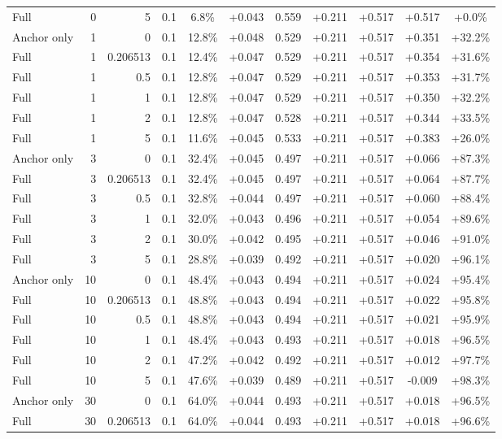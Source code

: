 \begin{table}[htbp]
\begin{tabular}{lrrrccccccc}
Full & 0 & 5 & 0.1 & 6.8\% & +0.043 & 0.559 & +0.211 & +0.517 & +0.517 & +0.0\% \\
Anchor only & 1 & 0 & 0.1 & 12.8\% & +0.048 & 0.529 & +0.211 & +0.517 & +0.351 & +32.2\% \\
Full & 1 & 0.206513 & 0.1 & 12.4\% & +0.047 & 0.529 & +0.211 & +0.517 & +0.354 & +31.6\% \\
Full & 1 & 0.5 & 0.1 & 12.8\% & +0.047 & 0.529 & +0.211 & +0.517 & +0.353 & +31.7\% \\
Full & 1 & 1 & 0.1 & 12.8\% & +0.047 & 0.529 & +0.211 & +0.517 & +0.350 & +32.2\% \\
Full & 1 & 2 & 0.1 & 12.8\% & +0.047 & 0.528 & +0.211 & +0.517 & +0.344 & +33.5\% \\
Full & 1 & 5 & 0.1 & 11.6\% & +0.045 & 0.533 & +0.211 & +0.517 & +0.383 & +26.0\% \\
Anchor only & 3 & 0 & 0.1 & 32.4\% & +0.045 & 0.497 & +0.211 & +0.517 & +0.066 & +87.3\% \\
Full & 3 & 0.206513 & 0.1 & 32.4\% & +0.045 & 0.497 & +0.211 & +0.517 & +0.064 & +87.7\% \\
Full & 3 & 0.5 & 0.1 & 32.8\% & +0.044 & 0.497 & +0.211 & +0.517 & +0.060 & +88.4\% \\
Full & 3 & 1 & 0.1 & 32.0\% & +0.043 & 0.496 & +0.211 & +0.517 & +0.054 & +89.6\% \\
Full & 3 & 2 & 0.1 & 30.0\% & +0.042 & 0.495 & +0.211 & +0.517 & +0.046 & +91.0\% \\
Full & 3 & 5 & 0.1 & 28.8\% & +0.039 & 0.492 & +0.211 & +0.517 & +0.020 & +96.1\% \\
Anchor only & 10 & 0 & 0.1 & 48.4\% & +0.043 & 0.494 & +0.211 & +0.517 & +0.024 & +95.4\% \\
Full & 10 & 0.206513 & 0.1 & 48.8\% & +0.043 & 0.494 & +0.211 & +0.517 & +0.022 & +95.8\% \\
Full & 10 & 0.5 & 0.1 & 48.8\% & +0.043 & 0.494 & +0.211 & +0.517 & +0.021 & +95.9\% \\
Full & 10 & 1 & 0.1 & 48.4\% & +0.043 & 0.493 & +0.211 & +0.517 & +0.018 & +96.5\% \\
Full & 10 & 2 & 0.1 & 47.2\% & +0.042 & 0.492 & +0.211 & +0.517 & +0.012 & +97.7\% \\
Full & 10 & 5 & 0.1 & 47.6\% & +0.039 & 0.489 & +0.211 & +0.517 & -0.009 & +98.3\% \\
Anchor only & 30 & 0 & 0.1 & 64.0\% & +0.044 & 0.493 & +0.211 & +0.517 & +0.018 & +96.5\% \\
Full & 30 & 0.206513 & 0.1 & 64.0\% & +0.044 & 0.493 & +0.211 & +0.517 & +0.018 & +96.6\% \\

\end{tabular}
\end{table}
